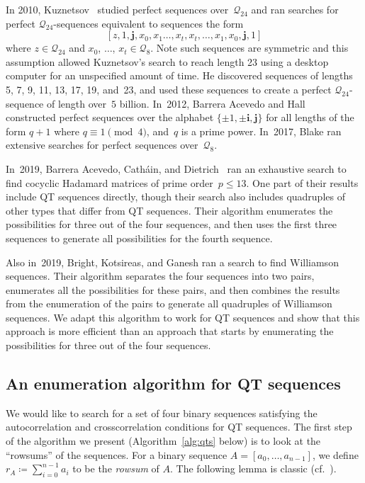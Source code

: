 \documentclass[12pt]{article}
\numberwithin{equation}{section}
\newcommand{\qi}{\mathbf{i}}
\newcommand{\qj}{\mathbf{j}}
\newcommand{\Q}{\mathcal{Q}}
\begin{document}
In 2010, Kuznetsov~\cite{Kuznetsov2010} studied perfect sequences over~$\Q_{24}$
and ran searches for perfect $\Q_{24}$-sequences equivalent to sequences the form
\[ [z,1,\qj,x_0,x_1\dotsc,x_t,x_t,\dotsc,x_1,x_0,\qj,1] \]
where $z\in\Q_{24}$ and $x_0$, $\dotsc$, $x_t\in\Q_8$.  Note such sequences are symmetric
and this assumption allowed Kuznetsov's search to reach length 23 using a desktop computer for an unspecified
amount of time.
He discovered sequences of lengths 5, 7, 9, 11, 13, 17, 19, and~23,
and used these sequences to create a perfect $\Q_{24}$-sequence of length over~$5$ billion.
In~2012, Barrera Acevedo and Hall~\cite{AcevedoHall2012} constructed perfect sequences over the alphabet $\{\pm1, \pm\qi, \qj\}$
for all lengths of the form $q + 1$ where $q \equiv 1 \pmod 4$, and~$q$ is a prime power.
In~2017, Blake \cite{BT17} ran extensive searches for perfect sequences over~$\Q_8$.

In~2019, Barrera Acevedo, Cath{\'a}in, and Dietrich~\cite{BarreraAcevedo2019}
ran an exhaustive search to find cocyclic Hadamard matrices of prime order~$p \leq 13$.
One part of their results include QT sequences directly, though their search also
includes quadruples of other types that differ from QT sequences.
Their algorithm enumerates the possibilities for three out of the four sequences, and then uses
the first three sequences to generate all possibilities for the fourth sequence.

Also in~2019, Bright, Kotsireas, and Ganesh ran a search to find Williamson sequences.
Their algorithm separates the four sequences into two pairs, enumerates all the possibilities for these pairs,
and then combines the results from the enumeration of the pairs to generate all quadruples of Williamson sequences.
We adapt this algorithm to work for QT sequences
and show that this approach is more efficient than an approach that starts by enumerating
the possibilities for three out of the four sequences.

\subsection{An enumeration algorithm for QT sequences}\label{sec:algorithm}

We would like to search for a set of four binary sequences satisfying the autocorrelation and crosscorrelation conditions for QT sequences.
The first step of the algorithm we present (Algorithm~\ref{alg:qts} below) is to look at the ``rowsums'' of the sequences.
For a binary sequence $A=[a_0,\dotsc,a_{n-1}]$, we define $r_A \coloneqq \sum_{i=0}^{n-1} a_i$ to be the \emph{rowsum\/} of $A$.
The following lemma is classic (cf.~\cite[eq.~15]{Williamson1944}).
\end{document}
